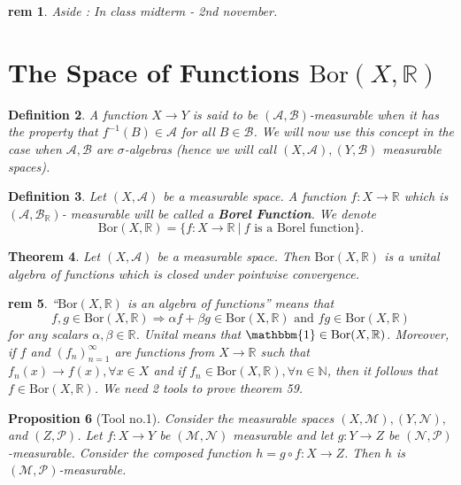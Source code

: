 \documentclass[letterpaper, 12pt]{article}
\newcommand{\fin}{\qquad \quad \hfill \framebox[1.75mm][l]{\,}}
\newcommand{\cB}{\mathcal{B}}
\newcommand{\cM}{\mathcal{M}}
\newcommand{\cN}{\mathcal{N}}
\newcommand{\bR}{\mathbb{R}}
\newcommand{\bN}{\mathbb{N}}
\newcommand{\cP}{\mathcal{P}}
\newcommand{\sA}{\mathcal{A}}
\theoremstyle{stdthm}
\newtheorem{thm}{Theorem}[section]
\newtheorem{prop}[thm]{Proposition}
\theoremstyle{stddef}
\newtheorem{defn}[thm]{Definition}
\newtheorem{rem}[thm]{rem} %
\theoremstyle{stdnonum}
\theoremstyle{stdqands}
\theoremstyle{stdbold}
\begin{document}
\begin{rem} Aside
: In class midterm - 2nd november. 
\end{rem}
\newpage


\section{The Space of Functions $\text{Bor}(X,\bR)$}

\begin{defn}
A function $X\rightarrow Y$ is said to be $(\sA,\cB)$-measurable when it has the property that $f^{-1}(B) \in \sA$ for all $B \in \cB$. We will now use this concept in the case when $\sA,\cB$ are $\sigma$-algebras (hence we will call $(X,\sA),(Y,\cB)$ measurable spaces). 
\end{defn}

\begin{defn}
Let $(X,\sA)$ be a measurable space. A function $f: X\rightarrow \bR$ which is $(\sA,\cB_\bR) $- measurable will be called a {\bf Borel Function}.  We denote 
\[
\mathrm{Bor}(X,\bR) = \{f: X \rightarrow \bR \ |\ f  \mbox{ is a Borel function}\}.
\]
\end{defn}

\begin{thm}
Let $(X,\sA)$ be a measurable space. Then $\mathrm{Bor}(X,\bR)$ is a unital algebra of functions which is closed under pointwise convergence. 
\end{thm}

\begin{rem}
``$\mathrm{Bor}(X,\bR)$ is an algebra of functions'' means that 
\[
f,g \in \mathrm{Bor}(X,\bR) \Longrightarrow \alpha f+\beta g \in \mathrm{Bor(X,\bR)}\text{ and } fg \in \mathrm{Bor}(X,\bR)
\]
for any scalars $\alpha,\beta \in \bR$. Unital means that $\mathbbm{1} \in \mathrm{Bor}(X,\bR)$. Moreover, if $f$ and $(f_n)_{n=1}^\infty$ are functions from $X \rightarrow \bR$ such that $f_n(x) \rightarrow f(x), \forall x \in X$ and if $f_n \in \mathrm{Bor}(X,\bR),\forall n \in \bN$, then it follows that $f \in \mathrm{Bor}(X,\bR)$. We need 2 tools to prove theorem 59. 
\end{rem}

\begin{prop} [Tool no.1]
Consider the measurable spaces $(X,\cM),(Y,\cN),$ and $(Z,\cP)$. Let $f: X\rightarrow Y$ be $(\cM,\cN)$ measurable and let $g: Y \rightarrow Z$ be $(\cN,\cP)$-measurable. Consider the composed function $h = g\circ f:X \rightarrow Z$. Then $h$ is $(\cM,\cP)$-measurable. 
\end{prop}
\end{document}
